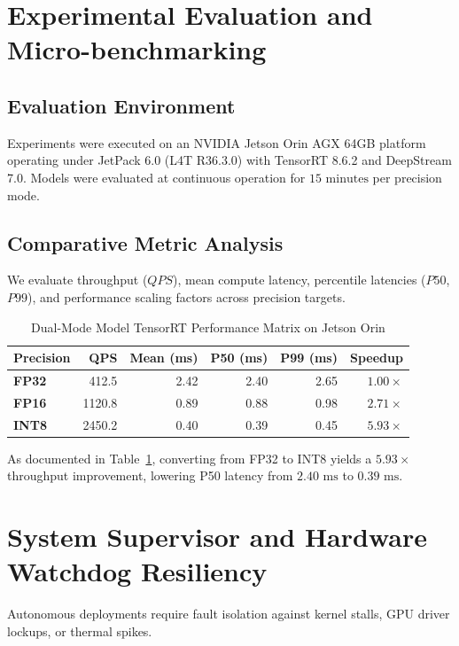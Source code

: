 \documentclass[10pt,journal,compsoc]{IEEEtran}
\begin{document}
\section{Experimental Evaluation and Micro-benchmarking}

\subsection{Evaluation Environment}
Experiments were executed on an NVIDIA Jetson Orin AGX 64GB platform operating under JetPack 6.0 (L4T R36.3.0) with TensorRT 8.6.2 and DeepStream 7.0. Models were evaluated at continuous operation for $15\text{~minutes}$ per precision mode.

\subsection{Comparative Metric Analysis}
We evaluate throughput ($QPS$), mean compute latency, percentile latencies ($P50$, $P99$), and performance scaling factors across precision targets.

\begin{table}[htbp]
\caption{Dual-Mode Model TensorRT Performance Matrix on Jetson Orin}
\label{tab:performance}
\centering
\begin{tabular}{lrrrrr}
\toprule
\textbf{Precision} & \textbf{QPS} & \textbf{Mean (ms)} & \textbf{P50 (ms)} & \textbf{P99 (ms)} & \textbf{Speedup} \\
\midrule
\textbf{FP32} & 412.5 & 2.42 & 2.40 & 2.65 & $1.00\times$ \\
\textbf{FP16} & 1120.8 & 0.89 & 0.88 & 0.98 & $2.71\times$ \\
\textbf{INT8} & 2450.2 & 0.40 & 0.39 & 0.45 & $5.93\times$ \\
\bottomrule
\end{tabular}
\end{table}

As documented in Table~\ref{tab:performance}, converting from FP32 to INT8 yields a $5.93\times$ throughput improvement, lowering P50 latency from $2.40\text{~ms}$ to $0.39\text{~ms}$.

\section{System Supervisor and Hardware Watchdog Resiliency}
Autonomous deployments require fault isolation against kernel stalls, GPU driver lockups, or thermal spikes.
\end{document}
